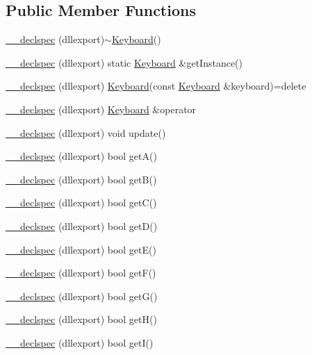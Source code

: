 \subsection*{Public Member Functions}
\begin{DoxyCompactItemize}
\item 
\hyperlink{class_keyboard_a00eaef56ca9aa2f74d0e7c2172df5d3a}{\-\_\-\-\_\-declspec} (dllexport)$\sim$\hyperlink{class_keyboard}{Keyboard}()
\item 
\hyperlink{class_keyboard_a882c222b6a482e1bf360ce4fc948df2d}{\-\_\-\-\_\-declspec} (dllexport) static \hyperlink{class_keyboard}{Keyboard} \&get\-Instance()
\item 
\hyperlink{class_keyboard_aef37332ba0d3ab91c7e34c00d60e9b7b}{\-\_\-\-\_\-declspec} (dllexport) \hyperlink{class_keyboard}{Keyboard}(const \hyperlink{class_keyboard}{Keyboard} \&keyboard)=delete
\item 
\hyperlink{class_keyboard_a0d5f5a80cb191e17a9139550e4d52cb9}{\-\_\-\-\_\-declspec} (dllexport) \hyperlink{class_keyboard}{Keyboard} \&operator
\item 
\hyperlink{class_keyboard_a6f8750f6067406807161bf35e9a6b054}{\-\_\-\-\_\-declspec} (dllexport) void update()
\item 
\hyperlink{class_keyboard_a9b3f47fd17a929f0376a279ee07de2cc}{\-\_\-\-\_\-declspec} (dllexport) bool get\-A()
\item 
\hyperlink{class_keyboard_afb7e9cafc6e41fb228ac2286cbe1c4ab}{\-\_\-\-\_\-declspec} (dllexport) bool get\-B()
\item 
\hyperlink{class_keyboard_a16e4e097bb54cd4b3800cf6e5e5a5091}{\-\_\-\-\_\-declspec} (dllexport) bool get\-C()
\item 
\hyperlink{class_keyboard_aeac229056a777f96b229746bea09e020}{\-\_\-\-\_\-declspec} (dllexport) bool get\-D()
\item 
\hyperlink{class_keyboard_ad5963c2afbac9a93537de53505275f74}{\-\_\-\-\_\-declspec} (dllexport) bool get\-E()
\item 
\hyperlink{class_keyboard_a13c386dd1f86f42373ab78f9349f6673}{\-\_\-\-\_\-declspec} (dllexport) bool get\-F()
\item 
\hyperlink{class_keyboard_af2cd616014cb7fde9ae0280d4853e111}{\-\_\-\-\_\-declspec} (dllexport) bool get\-G()
\item 
\hyperlink{class_keyboard_a851be8118c51c415f7c2bb3c9ca9cc9f}{\-\_\-\-\_\-declspec} (dllexport) bool get\-H()
\item 
\hyperlink{class_keyboard_a841cde291d237b494b9794a8521325cc}{\-\_\-\-\_\-declspec} (dllexport) bool get\-I()

\end{DoxyCompactItemize}
